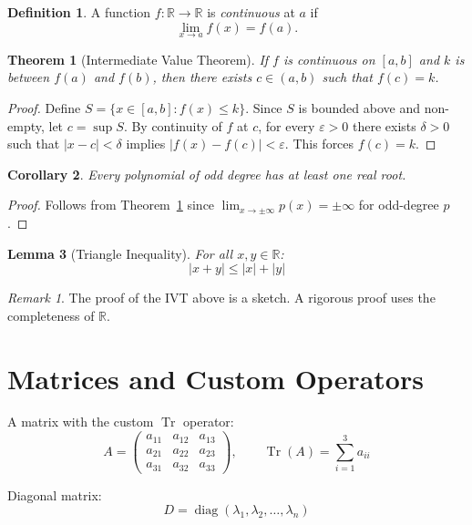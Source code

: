 \documentclass[12pt]{article}
\theoremstyle{plain}
\newtheorem{theorem}{Theorem}[section]
\newtheorem{lemma}[theorem]{Lemma}
\newtheorem{corollary}[theorem]{Corollary}
\theoremstyle{definition}
\newtheorem{definition}{Definition}[section]
\theoremstyle{remark}
\newtheorem{remark}{Remark}
\DeclareMathOperator{\Tr}{Tr}       %
\DeclareMathOperator{\diag}{diag}   %
\begin{document}
\begin{definition}
A function $f: \mathbb{R} \to \mathbb{R}$ is \emph{continuous} at $a$ if
\[
    \lim_{x \to a} f(x) = f(a).
\]
\end{definition}

\begin{theorem}[Intermediate Value Theorem]
\label{thm:ivt}
If $f$ is continuous on $[a,b]$ and $k$ is between $f(a)$ and $f(b)$, then
there exists $c \in (a,b)$ such that $f(c) = k$.
\end{theorem}

\begin{proof}
Define $S = \{x \in [a,b] : f(x) \le k\}$. Since $S$ is bounded above and
non-empty, let $c = \sup S$. By continuity of $f$ at $c$, for every
$\varepsilon > 0$ there exists $\delta > 0$ such that $|x - c| < \delta$
implies $|f(x) - f(c)| < \varepsilon$. This forces $f(c) = k$.
\end{proof}

\begin{corollary}
Every polynomial of odd degree has at least one real root.
\end{corollary}

\begin{proof}
Follows from Theorem~\ref{thm:ivt} since
$\lim_{x \to \pm\infty} p(x) = \pm\infty$ for odd-degree $p$.
\end{proof}

\begin{lemma}[Triangle Inequality]
For all $x, y \in \mathbb{R}$:
\begin{equation}
    |x + y| \le |x| + |y|
\end{equation}
\end{lemma}

\begin{remark}
The proof of the IVT above is a sketch. A rigorous proof uses the
completeness of $\mathbb{R}$.
\end{remark}

\section{Matrices and Custom Operators}

A matrix with the custom $\Tr$ operator:
\begin{equation}
    A = \begin{pmatrix}
        a_{11} & a_{12} & a_{13} \\
        a_{21} & a_{22} & a_{23} \\
        a_{31} & a_{32} & a_{33}
    \end{pmatrix},
    \qquad
    \Tr(A) = \sum_{i=1}^{3} a_{ii}
\end{equation}

Diagonal matrix:
\begin{equation}
    D = \diag(\lambda_1, \lambda_2, \ldots, \lambda_n)
\end{equation}
\end{document}
